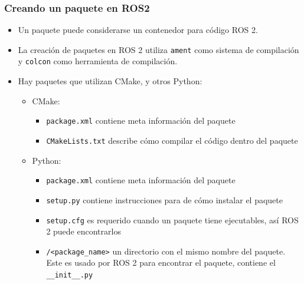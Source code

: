 \begin{frame}[fragile]
	\frametitle{Creando un paquete en ROS2}
    
    \begin{itemize}
        \item Un paquete puede considerarse un contenedor para código ROS 2. 

        \item La creación de paquetes en ROS 2 utiliza \lstinline[style=bash]{ament} como sistema de compilación y \lstinline[style=bash]{colcon} como herramienta de compilación.
        
        \item Hay paquetes que utilizan CMake, y otros Python:
        \begin{itemize}
            \item CMake:
            \begin{itemize}
            	\item \lstinline[style=bash]{package.xml} contiene meta información del paquete
            
            	\item \lstinline[style=bash]{CMakeLists.txt} describe cómo compilar el código dentro del paquete
            \end{itemize}
    
            \item Python:
            \begin{itemize}
                \item \lstinline[style=bash]{package.xml} contiene meta información del paquete
                
                \item \lstinline[style=bash]{setup.py} contiene instrucciones para de cómo instalar el paquete
                
                \item \lstinline[style=bash]{setup.cfg} es requerido cuando un paquete tiene ejecutables, así ROS 2 puede encontrarlos
                
                \item \lstinline[style=bash]{/<package_name>} un directorio con el mismo nombre del paquete. Este es usado por ROS 2 para encontrar el paquete, contiene el \lstinline[style=bash]{__init__.py}
            \end{itemize}
        \end{itemize}
    \end{itemize}	
\end{frame}


